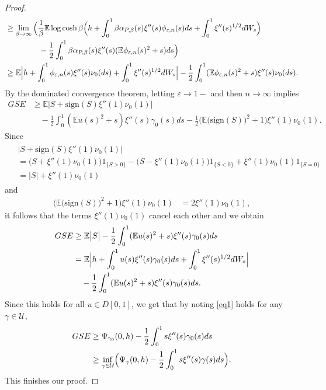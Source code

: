 \documentclass[12pt]{article}
\newcommand{\e}{\mathbb{E}}
\newenvironment{Proof of lemma}{\noindent{\bf Proof of Lemma}}{\hfill$\Box$\newline}
\newenvironment{Proof of theorem}{\noindent{\bf Proof of Theorem}}{\hfill{\footnotesize${\square}$}\newline}
\newenvironment{Proof of theorems}{\noindent{\bf Proof of Theorems}}{\hfill$\Box$\newline}
\newenvironment{Proof of proposition}{\noindent{\bf Proof of Proposition}}{\hfill$\Box$\newline}
\newenvironment{Proof of propositions}{\noindent{\bf Proof of Propositions}}{\hfill$\Box$\newline}
\newenvironment{Proof of exercise}{\noindent{\it Proof of Exercise:}}{\hfill$\Box$}
\begin{document}
\begin{proof}
\begin{align*}
	&\geq \lim_{\beta\rightarrow\infty}\Big(\frac{1}{\beta}\e \log \cosh \beta\Bigl(h+\int_0^1\beta\alpha_{P,\beta}(s)\xi''(s)\phi_{\varepsilon,n}(s)ds+\int_0^1\xi''(s)^{1/2}dW_s\Bigr)\\
	&\qquad \qquad\,\,-\frac{1}{2}\int_0^1\beta\alpha_{P,\beta}(s)\xi''(s)(\e \phi_{\varepsilon,n}(s)^2+s)ds\Bigr)\\
	&\geq \e \Bigl|h+\int_0^1 \phi_{\varepsilon,n}(s)\xi''(s)\nu_0(ds)+\int_0^1\xi''(s)^{1/2}dW_s\Bigr|-\frac{1}{2}\int_0^1(\e  \phi_{\varepsilon,n}(s)^2+s)\xi''(s)\nu_0(ds).
	\end{align*}
	By the dominated convergence theorem, letting $\varepsilon\rightarrow 1-$ and then $n\rightarrow\infty$ implies
	\begin{align*}
	GSE&\geq \e \bigl|S+\mbox{sign}(S)\xi''(1)\nu_0(1)\bigr|\\
	&\quad-\frac{1}{2}\int_0^1(\e  u(s)^2+s)\xi''(s)\gamma_0(s)ds-\frac{1}{2}\bigl(\e \bigl(\mbox{sign}(S)\bigr)^2+1\bigr)\xi''(1)\nu_0(1).
	\end{align*} 
    Since
	\begin{align}
	\begin{split}
	\label{ob}
    &\bigl|S+\mbox{sign}(S)\xi''(1)\nu_0(1)\bigr|\\
	&=\bigl(S+\xi''(1)\nu_0(1)\bigr)1_{\{S> 0\}}-\bigl(S-\xi''(1)\nu_0(1)\bigr)1_{\{S< 0\}}+\xi''(1)\nu_0(1)1_{\{S=0\}}\\
	&=|S|+\xi''(1)\nu_0(1)
		\end{split}
	\end{align}
	and
		\begin{align}\label{ob2}
		\bigl(\e \bigl(\mbox{sign}(S)\bigr)^2+1\bigr)\xi''(1)\nu_0(1)&=2\xi''(1)\nu_0(1),
		\end{align}
		it follows that the terms $\xi''(1)\nu_0(1)$ cancel each other and we obtain
		\begin{align*}
		GSE&\geq \e \bigl|S\bigr|-\frac{1}{2}\int_0^1(\e  u(s)^2+s)\xi''(s)\gamma_0(s)ds\\
		&=\e\Bigl| h+\int_{0}^1 u(s)\xi''(s)\gamma_0(s)ds+\int_0^1\xi''(s)^{1/2}dW_s\Bigr|\\
		&\quad-\frac{1}{2}\int_0^1(\e  u(s)^2+s)\xi''(s)\gamma_0(s)ds.
		\end{align*}
	Since this holds for all $u\in D[0,1]$, 
	we get that by noting \eqref{eq1} holds for any $\gamma\in\mathcal{U}$,
	\begin{align*}
	GSE&\geq \Psi_{\gamma_0}(0,h)-\frac{1}{2}\int_0^1s\xi''(s)\gamma_0(s)ds\\
	&\geq \inf_{\gamma\in\mathcal{U}}\Bigl(\Psi_{\gamma}(0,h)-\frac{1}{2}\int_0^1s\xi''(s)\gamma(s)ds\Bigr).
	\end{align*}
	This finishes our proof.
\end{proof}
\end{document}
